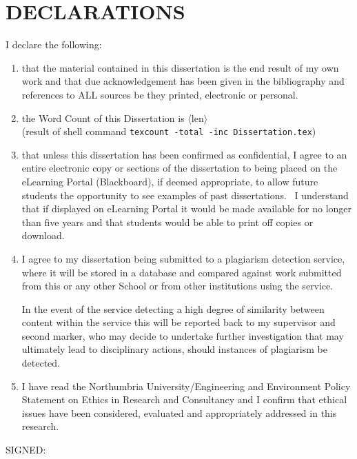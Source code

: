 
\chapter{DECLARATIONS}

I declare the following:

\begin{enumerate}

\item that the material contained in this dissertation is the end result of my own work and that due acknowledgement has been given in the bibliography and references to ALL sources be they printed, electronic or personal.

\item the Word Count of this Dissertation is $\langle\mathrm{len}\rangle$\\
(result of shell command \texttt{texcount -total -inc Dissertation.tex})

\item that unless this dissertation has been confirmed as confidential, I agree to an entire electronic copy or sections of the dissertation to being placed on the eLearning Portal (Blackboard), if deemed appropriate, to allow future students the opportunity to see examples of past dissertations.  I understand that if displayed on eLearning Portal it would be made available for no longer than five years and that students would be able to print off copies or download. 

\item I agree to my dissertation being submitted to a plagiarism detection service, where it will be stored in a database and compared against work submitted from this or any other School or from other institutions using the service. 

In the event of the service detecting a high degree of similarity between content within the service this will be reported back to my supervisor and second marker, who may decide to undertake further investigation that may ultimately lead to disciplinary actions, should instances of plagiarism be detected.

\item I have read the Northumbria University/Engineering and Environment Policy Statement on Ethics in Research and Consultancy and I confirm that ethical issues have been considered, evaluated and appropriately addressed in this research.
\end{enumerate}
\vspace{1in}
\large{SIGNED:\dotfill}
